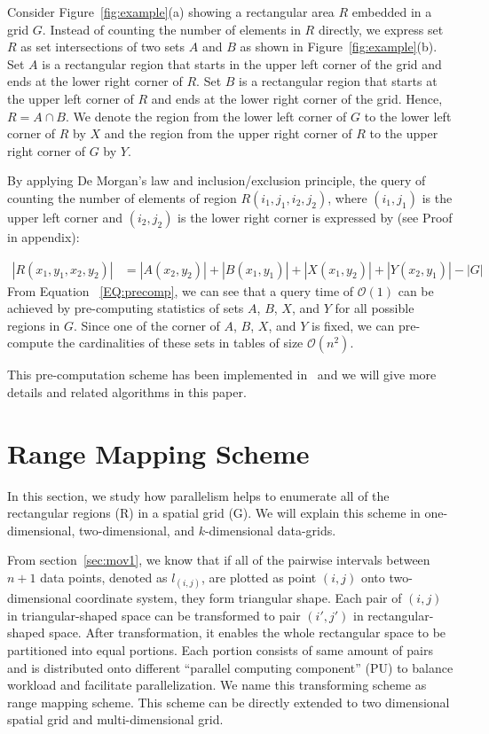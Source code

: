 \documentclass[AMA,LATO1COL]{WileyNJD-v2}
\newcommand\bigo{\mathcal O}
\begin{document}
Consider Figure~\ref{fig:example}(a) showing a rectangular area $R$ embedded in a grid $G$. Instead of counting the number of elements in $R$ directly, we express set $R$ as set intersections of two sets $A$ and $B$ as shown in Figure~\ref{fig:example}(b). Set $A$ is a rectangular region that starts in the upper left corner of the grid and ends at the lower right corner of $R$. Set $B$ is a rectangular region that starts at the upper left corner of $R$ and ends at the lower right corner of the grid. Hence, $R=A \cap B$. We denote the region from the lower left corner of $G$ to the lower left corner of $R$ by $X$ and the region from the upper right corner of $R$ to the upper right corner of $G$ by $Y$.

 By applying De Morgan's law and inclusion/exclusion principle, the query of counting the number of elements of region $R(i_1,j_1,i_2,j_2)$, where $(i_1,j_1)$ is the upper left corner and $(i_2,j_2)$ is the lower right corner is expressed by (see Proof in appendix):


\begin{equation}
\label{EQ:precomp}
\begin{split}
|R(x_1,y_1,x_2,y_2)|& = |A(x_2,y_2)| + |B(x_1,y_1)| + |X(x_1,y_2)|  + |Y(x_2,y_1)| - |G|
\end{split}
\end{equation}
\normalsize
From Equation ~\ref{EQ:precomp}, we can see that a query time of $\bigo(1)$ can be achieved by pre-computing statistics of sets $A$, $B$, $X$, and $Y$ for all possible regions in $G$. Since one of the corner of $A$, $B$, $X$, and $Y$ is fixed, we can pre-compute the cardinalities of these sets in tables of size $\bigo(n^2)$.

This pre-computation scheme has been implemented in~\cite{apweb} and we will give more details and related algorithms in this paper.

\section {Range Mapping Scheme} \label{RMS}
In this section, we study how parallelism helps to enumerate all of the rectangular regions (R) in a spatial grid (G). We will explain this scheme in one-dimensional, two-dimensional, and $k$-dimensional data-grids.

From section~\ref{sec:mov1}, we know that if all of the pairwise intervals between $n+1$ data points, denoted as $l_{(i,j)}$, are plotted as point $(i,j)$ onto two-dimensional coordinate system, they form triangular shape. Each pair of $(i,j)$ in triangular-shaped space can be transformed to pair $(i',j')$ in rectangular-shaped space. After transformation, it enables the whole rectangular space to be partitioned into equal portions. Each portion consists of same amount of pairs and is distributed onto different ``parallel computing component'' (PU) to balance workload and facilitate parallelization. We name this transforming scheme as range mapping scheme. This scheme can be directly extended to two dimensional spatial grid and multi-dimensional grid.
\end{document}
